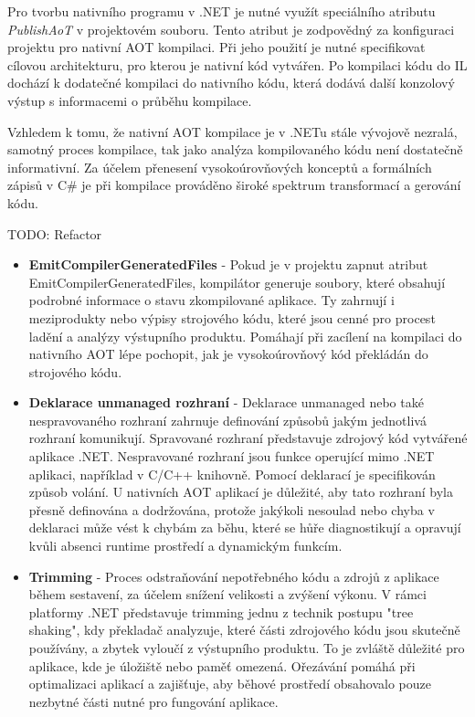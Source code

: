 
Pro tvorbu nativního programu v .NET je nutné využít speciálního atributu \emph{PublishAoT} v projektovém souboru. Tento atribut je zodpovědný za konfiguraci projektu pro nativní AOT kompilaci. Při jeho použití je nutné specifikovat cílovou architekturu, pro kterou je nativní kód vytvářen. Po kompilaci kódu do IL dochází k dodatečné kompilaci do nativního kódu, která dodává další konzolový výstup s informacemi o průběhu kompilace.

Vzhledem k tomu, že nativní AOT kompilace je v .NETu stále vývojově nezralá, samotný proces kompilace, tak jako analýza kompilovaného kódu není dostatečně informativní. Za účelem přenesení vysokoúrovňových konceptů a formálních zápisů v C\# je při kompilace prováděno široké spektrum transformací a gerování kódu.

TODO: Refactor
\begin{itemize}
    \item \textbf{EmitCompilerGeneratedFiles} - Pokud je v projektu zapnut atribut EmitCompilerGeneratedFiles, kompilátor generuje soubory, které obsahují podrobné informace o stavu zkompilované aplikace. Ty zahrnují i meziprodukty nebo výpisy strojového kódu, které jsou cenné pro procest ladění a analýzy výstupního produktu. Pomáhají při zacílení na kompilaci do nativního AOT lépe pochopit, jak je vysokoúrovňový kód překládán do strojového kódu.
    \item \textbf{Deklarace unmanaged rozhraní} - Deklarace unmanaged nebo také nespravovaného rozhraní zahrnuje definování způsobů jakým jednotlivá rozhraní komunikují. Spravované rozhraní představuje zdrojový kód vytvářené aplikace .NET. Nespravované rozhraní jsou funkce operující mimo .NET aplikaci, například v C/C++ knihovně. Pomocí deklarací je specifikován způsob volání. U nativních AOT aplikací je důležité, aby tato rozhraní byla přesně definována a dodržována, protože jakýkoli nesoulad nebo chyba v deklaraci může vést k chybám za běhu, které se hůře diagnostikují a opravují kvůli absenci runtime prostředí a dynamickým funkcím.
    \item \textbf{Trimming} - Proces odstraňování nepotřebného kódu a zdrojů z aplikace během sestavení, za účelem snížení velikosti a zvýšení výkonu. V rámci platformy .NET představuje trimming jednu z technik postupu "tree shaking", kdy překladač analyzuje, které části zdrojového kódu jsou skutečně používány, a zbytek vyloučí z výstupního produktu. To je zvláště důležité pro aplikace, kde je úložiště nebo paměť omezená. Ořezávání pomáhá při optimalizaci aplikací a zajišťuje, aby běhové prostředí obsahovalo pouze nezbytné části nutné pro fungování aplikace.
\end{itemize}

